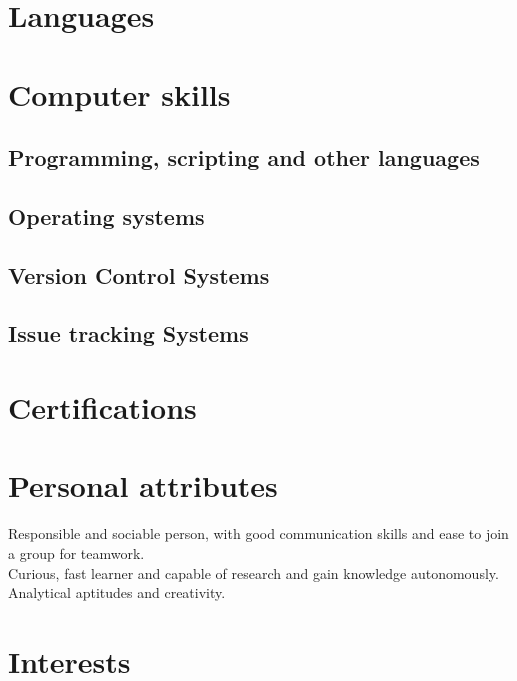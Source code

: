 \documentclass[12pt,a4paper]{moderncv}
\begin{document}
\section{Languages}
\section{Computer skills}
\subsection{Programming, scripting and other languages}
\subsection{Operating systems}
\subsection{Version Control Systems}
\subsection{Issue tracking Systems}
\section{Certifications}
\section{Personal attributes}
Responsible and sociable person, with good communication skills and ease to join a group for teamwork.\\ Curious, fast learner and capable of research and gain knowledge autonomously.\\
Analytical aptitudes and creativity.
\section{Interests}
\renewcommand{\listitemsymbol}{} %
\end{document}

